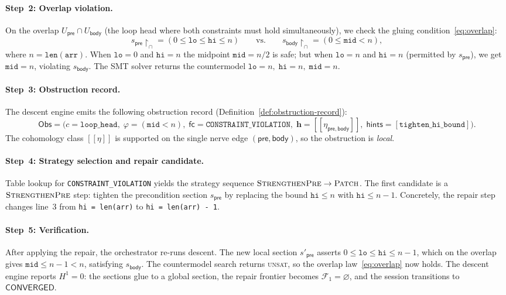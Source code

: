 \documentclass[11pt]{article}
\newcommand{\RF}{\mathcal{F}}               %
\newcommand{\Patch}{\textsc{Patch}}
\newcommand{\StrengthenPre}{\textsc{StrengthenPre}}
\newcommand{\cls}[1]{[\![#1]\!]}            %
\begin{document}
\paragraph{Step~2: Overlap violation.}
On the overlap $U_{\mathsf{pre}} \cap U_{\mathsf{body}}$ (the loop head
where both constraints must hold simultaneously), we check the gluing
condition~\eqref{eq:overlap}:
\[
  s_{\mathsf{pre}}\!\restriction_{\cap}
  = (0 \leq \mathtt{lo} \leq \mathtt{hi} \leq n)
  \qquad\text{vs.}\qquad
  s_{\mathsf{body}}\!\restriction_{\cap}
  = (0 \leq \mathtt{mid} < n),
\]
where $n = \mathtt{len(arr)}$.  When $\mathtt{lo} = 0$ and $\mathtt{hi} = n$
the midpoint $\mathtt{mid} = n/2$ is safe; but when $\mathtt{lo} = n$ and
$\mathtt{hi} = n$ (permitted by $s_{\mathsf{pre}}$), we get $\mathtt{mid} = n$,
violating $s_{\mathsf{body}}$.  The SMT solver returns the countermodel
$\mathtt{lo} = n,\; \mathtt{hi} = n,\; \mathtt{mid} = n$.

\paragraph{Step~3: Obstruction record.}
The descent engine emits the following obstruction record
(Definition~\ref{def:obstruction-record}):
\[
  \mathsf{Obs} = \bigl(
    c = \mathtt{loop\_head},\;
    \varphi = (\mathtt{mid} < n),\;
    \mathsf{fc} = \texttt{CONSTRAINT\_VIOLATION},\;
    \mathbf{h} = \cls{\eta_{\mathsf{pre},\mathsf{body}}},\;
    \mathsf{hints} = [\texttt{tighten\_hi\_bound}]
  \bigr).
\]
The cohomology class $\cls{\eta}$ is supported on the single nerve edge
$(\mathsf{pre}, \mathsf{body})$, so the obstruction is \emph{local}.

\paragraph{Step~4: Strategy selection and repair candidate.}
Table lookup for \texttt{CONSTRAINT\_VIOLATION} yields the strategy sequence
$\StrengthenPre \to \Patch$.  The first candidate is a $\StrengthenPre$ step:
tighten the precondition section $s_{\mathsf{pre}}$ by replacing the bound
$\mathtt{hi} \leq n$ with $\mathtt{hi} \leq n - 1$.  Concretely, the repair
step changes line~3 from \texttt{hi = len(arr)} to \texttt{hi = len(arr) - 1}.

\paragraph{Step~5: Verification.}
After applying the repair, the orchestrator re-runs descent.  The new local
section $s'_{\mathsf{pre}}$ asserts $0 \leq \mathtt{lo} \leq \mathtt{hi}
\leq n - 1$, which on the overlap gives $\mathtt{mid} \leq n - 1 < n$,
satisfying $s_{\mathsf{body}}$.  The countermodel search returns \textsc{unsat},
so the overlap law~\eqref{eq:overlap} now holds.  The descent engine reports
$H^1 = 0$: the sections glue to a global section, the repair frontier
becomes $\RF_1 = \varnothing$, and the session transitions to
$\mathsf{CONVERGED}$.
\end{document}
